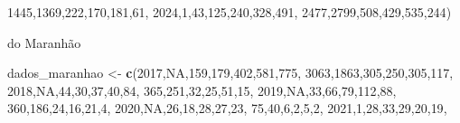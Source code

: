 \documentclass[
]{article}
\newenvironment{Shaded}{\begin{snugshade}}{\end{snugshade}}
\newcommand{\ConstantTok}[1]{\textcolor[rgb]{0.56,0.35,0.01}{#1}}
\newcommand{\DecValTok}[1]{\textcolor[rgb]{0.00,0.00,0.81}{#1}}
\newcommand{\FunctionTok}[1]{\textcolor[rgb]{0.13,0.29,0.53}{\textbf{#1}}}
\newcommand{\NormalTok}[1]{#1}
\newcommand{\OtherTok}[1]{\textcolor[rgb]{0.56,0.35,0.01}{#1}}
\begin{document}
\begin{Shaded}
\begin{Highlighting}[]
                \DecValTok{1445}\NormalTok{,}\DecValTok{1369}\NormalTok{,}\DecValTok{222}\NormalTok{,}\DecValTok{170}\NormalTok{,}\DecValTok{181}\NormalTok{,}\DecValTok{61}\NormalTok{,}
               \DecValTok{2024}\NormalTok{,}\DecValTok{1}\NormalTok{,}\DecValTok{43}\NormalTok{,}\DecValTok{125}\NormalTok{,}\DecValTok{240}\NormalTok{,}\DecValTok{328}\NormalTok{,}\DecValTok{491}\NormalTok{,}
                \DecValTok{2477}\NormalTok{,}\DecValTok{2799}\NormalTok{,}\DecValTok{508}\NormalTok{,}\DecValTok{429}\NormalTok{,}\DecValTok{535}\NormalTok{,}\DecValTok{244}\NormalTok{)}
\end{Highlighting}
\end{Shaded}

do Maranhão

\begin{Shaded}
\begin{Highlighting}[]
\NormalTok{dados\_maranhao }\OtherTok{\textless{}{-}} \FunctionTok{c}\NormalTok{(}\DecValTok{2017}\NormalTok{,}\ConstantTok{NA}\NormalTok{,}\DecValTok{159}\NormalTok{,}\DecValTok{179}\NormalTok{,}\DecValTok{402}\NormalTok{,}\DecValTok{581}\NormalTok{,}\DecValTok{775}\NormalTok{,}
                      \DecValTok{3063}\NormalTok{,}\DecValTok{1863}\NormalTok{,}\DecValTok{305}\NormalTok{,}\DecValTok{250}\NormalTok{,}\DecValTok{305}\NormalTok{,}\DecValTok{117}\NormalTok{,}
                    \DecValTok{2018}\NormalTok{,}\ConstantTok{NA}\NormalTok{,}\DecValTok{44}\NormalTok{,}\DecValTok{30}\NormalTok{,}\DecValTok{37}\NormalTok{,}\DecValTok{40}\NormalTok{,}\DecValTok{84}\NormalTok{,}
                      \DecValTok{365}\NormalTok{,}\DecValTok{251}\NormalTok{,}\DecValTok{32}\NormalTok{,}\DecValTok{25}\NormalTok{,}\DecValTok{51}\NormalTok{,}\DecValTok{15}\NormalTok{,}
                    \DecValTok{2019}\NormalTok{,}\ConstantTok{NA}\NormalTok{,}\DecValTok{33}\NormalTok{,}\DecValTok{66}\NormalTok{,}\DecValTok{79}\NormalTok{,}\DecValTok{112}\NormalTok{,}\DecValTok{88}\NormalTok{,}
                      \DecValTok{360}\NormalTok{,}\DecValTok{186}\NormalTok{,}\DecValTok{24}\NormalTok{,}\DecValTok{16}\NormalTok{,}\DecValTok{21}\NormalTok{,}\DecValTok{4}\NormalTok{,}
                    \DecValTok{2020}\NormalTok{,}\ConstantTok{NA}\NormalTok{,}\DecValTok{26}\NormalTok{,}\DecValTok{18}\NormalTok{,}\DecValTok{28}\NormalTok{,}\DecValTok{27}\NormalTok{,}\DecValTok{23}\NormalTok{,}
                      \DecValTok{75}\NormalTok{,}\DecValTok{40}\NormalTok{,}\DecValTok{6}\NormalTok{,}\DecValTok{2}\NormalTok{,}\DecValTok{5}\NormalTok{,}\DecValTok{2}\NormalTok{,}
                    \DecValTok{2021}\NormalTok{,}\DecValTok{1}\NormalTok{,}\DecValTok{28}\NormalTok{,}\DecValTok{33}\NormalTok{,}\DecValTok{29}\NormalTok{,}\DecValTok{20}\NormalTok{,}\DecValTok{19}\NormalTok{,}

\end{Highlighting}
\end{Shaded}
\end{document}
